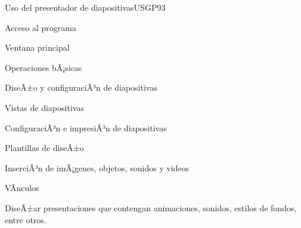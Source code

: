 \begin{syllabus}
\begin{unit}{Uso del presentador de diapositivas}{USGP}{9}{3}
\begin{topics}
      \item Acceso al programa
      \item Ventana principal
      \item Operaciones bÃ¡sicas
      \item DiseÃ±o y configuraciÃ³n de diapositivas
      \item Vistas de diapositivas
      \item ConfiguraciÃ³n e impresiÃ³n de diapositivas
      \item Plantillas de diseÃ±o 
      \item InserciÃ³n de imÃ¡genes, objetos, sonidos y videos
      \item VÃ­nculos
\end{topics}
\begin{unitgoals}
   \item DiseÃ±ar presentaciones que contengan animaciones, sonidos, estilos de fondos, entre otros.
\end{unitgoals}
\end{unit}

\begin{coursebibliography}

\end{coursebibliography}

\end{syllabus}
